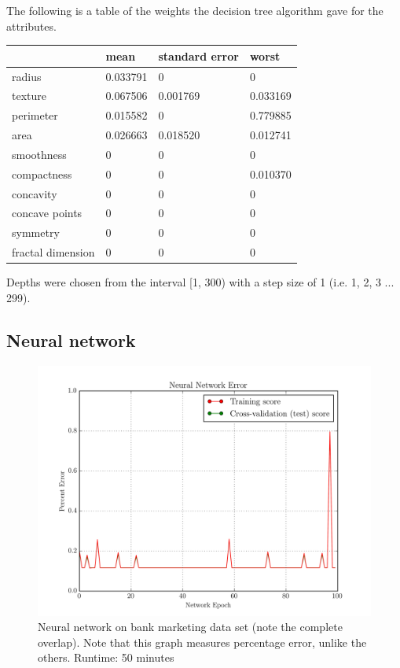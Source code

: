The following is a table of the weights the decision tree algorithm gave for the attributes.
\begin{center}
    \begin{tabular}{l||l|l|l}
                          & mean      & standard error & worst\\
        \hline
        radius            & 0.033791  & 0              & 0\\
        texture           & 0.067506  & 0.001769       & 0.033169\\
        perimeter         & 0.015582  & 0              & 0.779885\\
        area              & 0.026663  & 0.018520       & 0.012741\\
        smoothness        & 0         & 0              & 0\\
        compactness       & 0         & 0              & 0.010370\\
        concavity         & 0         & 0              & 0\\ 
        concave points    & 0         & 0              & 0\\
        symmetry          & 0         & 0              & 0\\
        fractal dimension & 0         & 0              & 0\\
    \end{tabular}
\end{center}

Depths were chosen from the interval [1, 300) with a step size of 1 (i.e. 1, 2, 3 ... 299).

\subsection{Neural network}

\begin{figure}[H]
    \centering
    \includegraphics[width=.7\textwidth]{bank/nn.png}
    \caption{Neural network on bank marketing data set (note the complete overlap). Note that this graph measures percentage error, unlike the others. Runtime: 50 minutes}
\end{figure}

